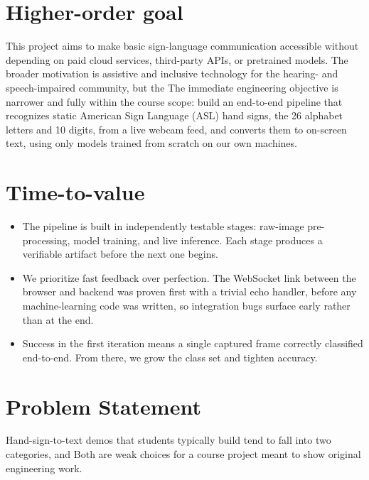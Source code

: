 \documentclass[12pt,a4paper]{article}
\begin{document}
\section{Higher-order goal}

This project aims to make basic sign-language communication accessible without depending on
paid cloud services, third-party APIs, or pretrained models. The broader motivation is
assistive and inclusive technology for the hearing- and speech-impaired community, but the
The immediate engineering objective is narrower and fully within the course scope: build an
end-to-end pipeline that recognizes static American Sign Language (ASL) hand signs, the 26
alphabet letters and 10 digits, from a live webcam feed, and converts them to on-screen text,
using only models trained from scratch on our own machines.


\section{Time-to-value}

\begin{itemize}[leftmargin=*]

  \item The pipeline is built in independently testable stages: raw-image pre-processing,
  model training, and live inference. Each stage produces a verifiable artifact before the
  next one begins.

  \item We prioritize fast feedback over perfection. The WebSocket link between the browser and
  backend was proven first with a trivial echo handler, before any machine-learning code was
  written, so integration bugs surface early rather than at the end.

  \item Success in the first iteration means a single captured frame correctly classified
  end-to-end. From there, we grow the class set and tighten accuracy.

\end{itemize}


\section{Problem Statement}

Hand-sign-to-text demos that students typically build tend to fall into two categories, and
Both are weak choices for a course project meant to show original engineering work.
\end{document}

